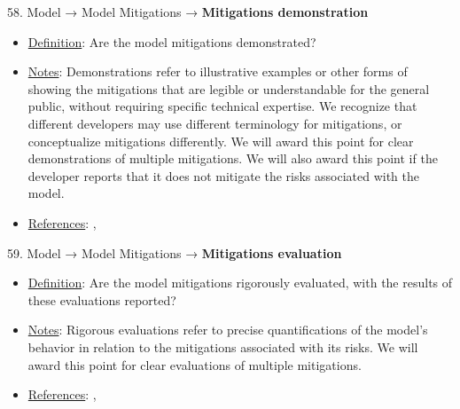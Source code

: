 58. Model → Model Mitigations → \textbf{Mitigations demonstration}
\vspace{-\parskip}
\begin{itemize}
\item
\underline{Definition}: Are the model mitigations demonstrated?
\item
\underline{Notes}: Demonstrations refer to illustrative examples or other forms of showing the mitigations that are legible or understandable for the general public, without requiring specific technical expertise. We recognize that different developers may use different terminology for mitigations, or conceptualize mitigations differently. We will award this point for clear demonstrations of multiple mitigations. We will also award this point if the developer reports that it does not mitigate the risks associated with the model.
\item
\underline{References}: \citet{solaiman2023evaluating}, \citet{weidinger2021ethical}
\end{itemize}


59. Model → Model Mitigations → \textbf{Mitigations evaluation}
\vspace{-\parskip}
\begin{itemize}
\item
\underline{Definition}: Are the model mitigations rigorously evaluated, with the results of these evaluations reported?
\item
\underline{Notes}: Rigorous evaluations refer to precise quantifications of the model's behavior in relation to the mitigations associated with its risks. We will award this point for clear evaluations of multiple mitigations.
\item
\underline{References}: \citet{huang2023catastrophic}, \citet{weidinger2021ethical}
\end{itemize}


